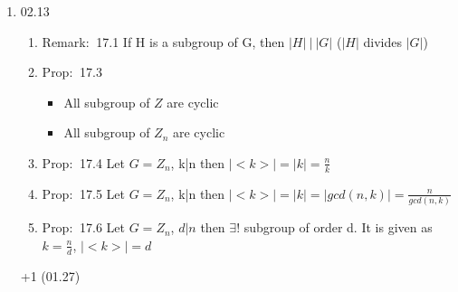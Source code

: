 \documentclass[12pt]{article}
\newcommand{\prop}{{\color{blue} Prop: $\ $}}
\newcommand{\rem}{{\color{blue} Remark: $\ $}}
\begin{document}
\begin{enumerate}
    \item 02.13
    
    \begin{enumerate}
        \item \rem 17.1 If H is a subgroup of G, then $|H| \ | \ |G|$ ($|H|$ divides $|G|$)
        \item \prop 17.3
        \begin{itemize}
            \item All subgroup of $Z$ are cyclic
            \item All subgroup of $Z_n$ are cyclic
        \end{itemize}
        \item \prop 17.4 Let $G = Z_n$, k|n then $|<k>| = |k| = \frac{n}{k}$
        \item \prop 17.5 Let $G = Z_n$, k|n then $|<k>| = |k| = |gcd(n,k)| =  \frac{n}{gcd(n,k)}$
        \item \prop 17.6 Let $G = Z_n$, $d|n$ then $\exists!$ subgroup of order d. It is given as $k = \frac{n}{d}$, $|<k>| = d$
    \end{enumerate}

+1 (01.27)
\end{enumerate}
\end{document}
